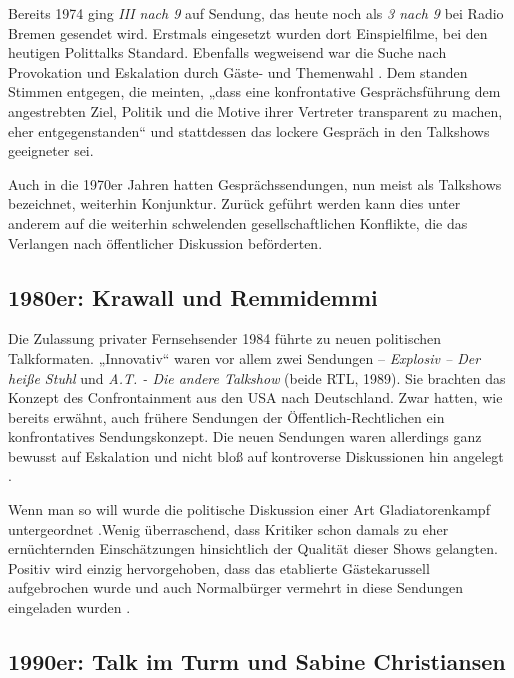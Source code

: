 Bereits 1974 ging \textit{III nach 9} auf Sendung, das heute noch als \textit{3 nach 9} bei Radio Bremen gesendet wird. Erstmals eingesetzt wurden dort Einspielfilme, bei den heutigen Polittalks Standard. Ebenfalls wegweisend war die Suche nach Provokation und Eskalation durch Gäste- und Themenwahl \parencite[242-246]{kellerGeschichteTalkshowDeutschland2009}. Dem standen Stimmen entgegen, die meinten, „dass eine konfrontative Gesprächsführung dem angestrebten Ziel, Politik und die Motive ihrer Vertreter transparent zu machen, eher entgegenstanden“ \parencite[241]{kellerGeschichteTalkshowDeutschland2009} und stattdessen das lockere Gespräch in den Talkshows geeigneter sei.

Auch in die 1970er Jahren hatten Gesprächssendungen, nun meist als Talkshows bezeichnet, weiterhin Konjunktur. Zurück geführt werden kann dies unter anderem auf die weiterhin schwelenden gesellschaftlichen Konflikte, die das Verlangen nach öffentlicher Diskussion beförderten.

\subsection{1980er: Krawall und Remmidemmi}

Die Zulassung privater Fernsehsender 1984 führte zu neuen politischen Talkformaten. „Innovativ“ waren vor allem zwei Sendungen – \textit{Explosiv – Der heiße Stuhl} und \textit{A.T. - Die andere Talkshow} (beide RTL, 1989). Sie brachten das Konzept des Confrontainment aus den USA nach Deutschland. Zwar hatten, wie bereits erwähnt, auch frühere Sendungen der Öffentlich-Rechtlichen ein konfrontatives Sendungskonzept. Die neuen Sendungen waren allerdings ganz bewusst auf Eskalation und nicht bloß auf kontroverse Diskussionen hin angelegt \parencite[273f.]{kellerGeschichteTalkshowDeutschland2009}.

Wenn man so will wurde die politische Diskussion einer Art Gladiatorenkampf untergeordnet \parencite[151]{faircloughPoliticalDiscourseMedia1998}.Wenig überraschend, dass Kritiker schon damals zu eher ernüchternden Einschätzungen hinsichtlich der Qualität dieser Shows gelangten. Positiv wird einzig hervorgehoben, dass das etablierte Gästekarussell aufgebrochen wurde und auch Normalbürger vermehrt in diese Sendungen eingeladen wurden \parencite[293f.]{kellerGeschichteTalkshowDeutschland2009}.

\subsection{1990er: Talk im Turm und Sabine Christiansen}


